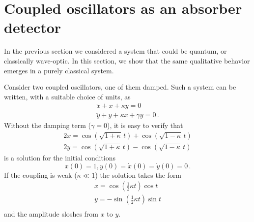 \documentclass[12pt,aps,prb,preprint]{revtex4}
\begin{document}
\section{Coupled oscillators as an absorber detector}

In the previous section we considered a system that could be quantum,
or classically wave-optic.  In this section, we show that the same
qualitative behavior emerges in a purely classical system.

Consider two coupled oscillators, one of them damped.  Such a system
can be written, with a suitable choice of units, as
\begin{equation}
\begin{array}{l}
\ddot x + x + \kappa y = 0 \\
\ddot y + y + \kappa x + \gamma y = 0 \,.
\label{eqn:coupled}
\end{array}
\end{equation}
Without the damping term ($\gamma=0$), it is easy to verify that
\begin{equation}
\begin{array}{l}
2x = \cos(\sqrt{1+\kappa}\,t) + \cos(\sqrt{1-\kappa}\,t)  \\
2y = \cos(\sqrt{1+\kappa}\,t) - \cos(\sqrt{1-\kappa}\,t)
\end{array}
\end{equation}
is a solution for the initial conditions
\begin{equation}
x(0) = 1, y(0) = \dot x(0) = \dot y(0) = 0 \,.
\label{eqn:inic}
\end{equation}
If the coupling is weak ($\kappa\ll1$) the solution takes the form
\begin{equation}
\begin{array}{l}
x = \cos\left(\frac12\kappa t\right) \cos t \\
y = -\sin\left(\frac12\kappa t\right) \sin t \\
\end{array}
\end{equation}
and the amplitude sloshes from $x$ to $y$.
\end{document}
